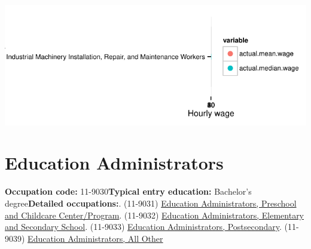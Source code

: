 \documentclass[a4paper,10pt]{article}\usepackage[]{graphicx}\usepackage[]{color}
\makeatletter
\def\maxwidth{ %
  \ifdim\Gin@nat@width>\linewidth
    \linewidth
  \else
    \Gin@nat@width
  \fi
}
\makeatother
\begin{document}
{\centering \includegraphics[width=\maxwidth]{figure/unnamed-chunk-278} 

}


\newpage\section{Education Administrators}\textbf{Occupation code:} 11-9030\newline\textbf{Typical entry education:} Bachelor's degree\newline\textbf{Detailed occupations:}. (11-9031)  \href{http://www.bls.gov/oes/current/oes119031.htm}{Education Administrators, Preschool and Childcare Center/Program}. (11-9032)  \href{http://www.bls.gov/oes/current/oes119032.htm}{Education Administrators, Elementary and Secondary School}. (11-9033)  \href{http://www.bls.gov/oes/current/oes119033.htm}{Education Administrators, Postsecondary}. (11-9039)  \href{http://www.bls.gov/oes/current/oes119039.htm}{Education Administrators, All Other}\newline%
\end{document}
